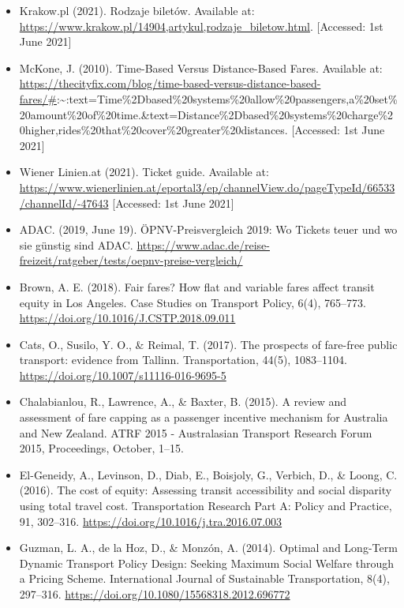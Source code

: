 \documentclass[
]{book}
\providecommand{\tightlist}{%
  \setlength{\itemsep}{0pt}\setlength{\parskip}{0pt}}
\begin{document}
\begin{itemize}
\tightlist
\item
  Krakow.pl (2021). Rodzaje biletów. Available at: \url{https://www.krakow.pl/14904,artykul,rodzaje_biletow.html}. {[}Accessed: 1st June 2021{]}
\item
  McKone, J. (2010). Time-Based Versus Distance-Based Fares. Available at: \url{https://thecityfix.com/blog/time-based-versus-distance-based-fares/\#}:\textasciitilde:text=Time\%2Dbased\%20systems\%20allow\%20passengers,a\%20set\%20amount\%20of\%20time.\&text=Distance\%2Dbased\%20systems\%20charge\%20higher,rides\%20that\%20cover\%20greater\%20distances. {[}Accessed: 1st June 2021{]}
\item
  Wiener Linien.at (2021). Ticket guide. Available at: \url{https://www.wienerlinien.at/eportal3/ep/channelView.do/pageTypeId/66533/channelId/-47643} {[}Accessed: 1st June 2021{]}
\item
  ADAC. (2019, June 19). ÖPNV-Preisvergleich 2019: Wo Tickets teuer und wo sie günstig sind \textbar{} ADAC. \url{https://www.adac.de/reise-freizeit/ratgeber/tests/oepnv-preise-vergleich/}
\item
  Brown, A. E. (2018). Fair fares? How flat and variable fares affect transit equity in Los Angeles. Case Studies on Transport Policy, 6(4), 765--773. \url{https://doi.org/10.1016/J.CSTP.2018.09.011}
\item
  Cats, O., Susilo, Y. O., \& Reimal, T. (2017). The prospects of fare-free public transport: evidence from Tallinn. Transportation, 44(5), 1083--1104. \url{https://doi.org/10.1007/s11116-016-9695-5}
\item
  Chalabianlou, R., Lawrence, A., \& Baxter, B. (2015). A review and assessment of fare capping as a passenger incentive mechanism for Australia and New Zealand. ATRF 2015 - Australasian Transport Research Forum 2015, Proceedings, October, 1--15.
\item
  El-Geneidy, A., Levinson, D., Diab, E., Boisjoly, G., Verbich, D., \& Loong, C. (2016). The cost of equity: Assessing transit accessibility and social disparity using total travel cost. Transportation Research Part A: Policy and Practice, 91, 302--316. \url{https://doi.org/10.1016/j.tra.2016.07.003}
\item
  Guzman, L. A., de la Hoz, D., \& Monzón, A. (2014). Optimal and Long-Term Dynamic Transport Policy Design: Seeking Maximum Social Welfare through a Pricing Scheme. International Journal of Sustainable Transportation, 8(4), 297--316. \url{https://doi.org/10.1080/15568318.2012.696772}

\end{itemize}
\end{document}
